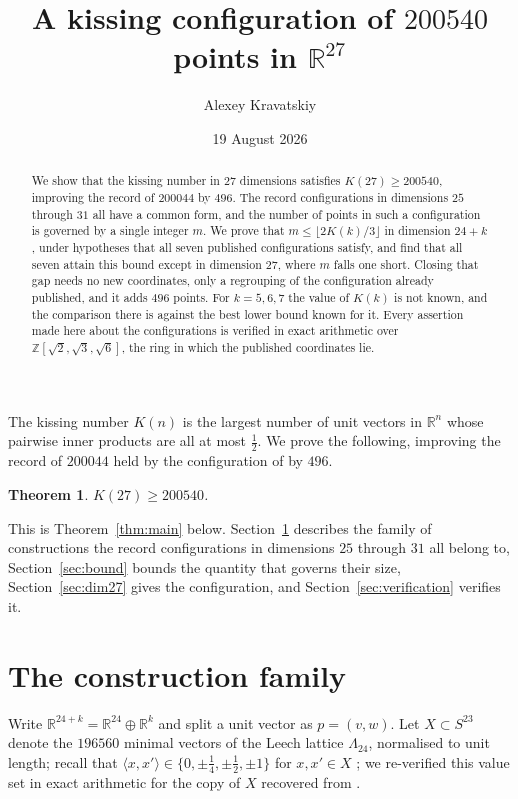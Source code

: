 \documentclass[11pt]{amsart}
\title{A kissing configuration of $200540$ points in $\mathbb{R}^{27}$}
\author{Alexey Kravatskiy}
\date{19 August 2026}
\newtheorem*{theorem*}{Theorem}
\theoremstyle{remark}
\newcommand{\Leech}{\Lambda_{24}}
\newcommand{\ip}[2]{\langle #1,#2\rangle}
\begin{document}
\begin{abstract}
We show that the kissing number in $27$ dimensions satisfies $K(27)\ge 200540$,
improving the record of $200044$ by $496$. The record configurations in
dimensions $25$ through $31$ all have a common form, and the number of points
in such a configuration is governed by a single integer $m$. We prove that
$m\le\lfloor 2K(k)/3\rfloor$ in dimension $24+k$, under hypotheses that all
seven published configurations satisfy, and find that all seven attain this
bound except in dimension $27$, where $m$ falls one short. Closing that gap
needs no new coordinates, only a regrouping of the configuration already
published,
and it adds $496$ points. For $k=5,6,7$ the value of $K(k)$ is not known, and
the comparison there is against the best lower bound known for it. Every
assertion made here about the configurations is verified in exact arithmetic
over $\mathbb Z[\sqrt2,\sqrt3,\sqrt6]$, the ring in which the published
coordinates lie.
\end{abstract}

\maketitle

The kissing number $K(n)$ is the largest number of unit vectors in
$\mathbb{R}^{n}$ whose pairwise inner products are all at most $\tfrac12$. We
prove the following, improving the record of $200044$ held by the configuration
of \cite{ma2025} by $496$.

\begin{theorem*}
$K(27)\ge 200540$.
\end{theorem*}

This is Theorem~\ref{thm:main} below. Section~\ref{sec:family} describes the
family of constructions the record configurations in dimensions $25$ through
$31$ all belong to, Section~\ref{sec:bound} bounds the quantity that governs
their size, Section~\ref{sec:dim27} gives the configuration, and
Section~\ref{sec:verification} verifies it.

\section{The construction family}\label{sec:family}

Write $\mathbb{R}^{24+k}=\mathbb{R}^{24}\oplus\mathbb{R}^{k}$ and split a unit
vector as $p=(v,w)$. Let $X\subset S^{23}$ denote the $196560$ minimal vectors
of the Leech lattice $\Leech$, normalised to unit length; recall that
$\ip{x}{x'}\in\{0,\pm\tfrac14,\pm\tfrac12,\pm1\}$ for $x,x'\in X$ \cite{cs};
we re-verified this value set in exact arithmetic for the copy of $X$ recovered
from \cite{cohn-data}.
\end{document}
